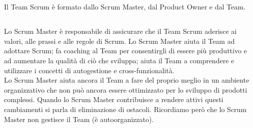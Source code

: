 \section*{\color{Blue}{I RUOLI IN SCRUM}}
\label{sec:roles}
Il Team Scrum \`e  formato dallo Scrum Master, dal Product Owner e dal Team.

\subsection*{\color{Blue}{LO SCRUM MASTER}}
\label{sec:scrummaster}
Lo Scrum Master \`e responsabile di assicurare che il Team Scrum aderisce ai valori, alle prassi e alle regole di Scrum. Lo Scrum Master aiuta il Team ad adottare Scrum; fa coaching al Team per consentirgli di essere pi\`u produttivo e ad aumentare la qualit\`a di ci\`o che sviluppa; aiuta il Team a comprendere e utilizzare i concetti di autogestione e cross-funzionalit\`a.\\
Lo Scrum Master aiuta ancora il Team a fare del proprio meglio in un ambiente organizzativo che non pu\`o ancora essere ottimizzato per lo sviluppo di prodotti complessi. Quando lo Scrum Master contribuisce a rendere attivi questi cambiamenti si parla di eliminazione di ostacoli. Ricordiamo per\`o che lo Scrum Master non gestisce il Team (\`e autoorganizzato).

\vspace{0.4cm}

\vspace{0.4cm}


